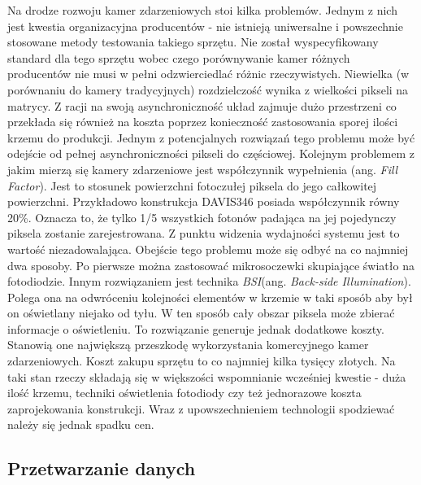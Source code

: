    Na drodze rozwoju kamer zdarzeniowych stoi kilka problemów. Jednym z nich jest kwestia organizacyjna producentów - nie istnieją uniwersalne i powszechnie stosowane metody testowania takiego sprzętu. Nie został wyspecyfikowany standard dla tego sprzętu wobec czego porównywanie kamer różnych producentów nie musi w pełni odzwierciedlać różnic rzeczywistych.
   Niewielka (w porównaniu do kamery tradycyjnych) rozdzielczość wynika z wielkości pikseli na matrycy. Z racji na swoją asynchroniczność układ zajmuje dużo przestrzeni co przekłada się również na koszta poprzez konieczność zastosowania sporej ilości krzemu do produkcji. Jednym z potencjalnych rozwiązań tego problemu może być odejście od pełnej asynchroniczności pikseli do częściowej. Kolejnym problemem z jakim mierzą się kamery zdarzeniowe jest współczynnik wypełnienia (ang. \emph{Fill Factor}). Jest to stosunek powierzchni fotoczułej piksela do jego całkowitej powierzchni. Przykładowo konstrukcja DAVIS346 posiada współczynnik równy 20\%. Oznacza to, że tylko 1/5 wszystkich fotonów padająca na jej pojedynczy piksela zostanie zarejestrowana. Z punktu widzenia wydajności systemu jest to wartość niezadowalająca. Obejście tego problemu może się odbyć na co najmniej dwa sposoby. Po pierwsze można zastosować mikrosoczewki skupiające światło na fotodiodzie. Innym rozwiązaniem jest technika \emph{BSI}(ang. \emph{Back-side Illumination}). Polega ona na odwróceniu kolejności elementów w krzemie w taki sposób aby był on oświetlany niejako od tyłu. W ten sposób cały obszar piksela może zbierać informacje o oświetleniu. To rozwiązanie generuje jednak dodatkowe koszty. Stanowią one największą przeszkodę wykorzystania komercyjnego kamer zdarzeniowych. Koszt zakupu sprzętu to co najmniej kilka tysięcy złotych. Na taki stan rzeczy składają się w większości wspomnianie wcześniej kwestie - duża ilość krzemu, techniki oświetlenia fotodiody czy też jednorazowe koszta zaprojekowania konstrukcji. Wraz z upowszechnieniem technologii spodziewać należy się jednak spadku cen.
    
    
    \subsection{Przetwarzanie danych}
    \label{subsec:Przetwarzanie}
    
